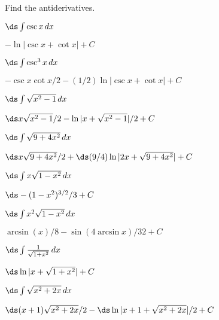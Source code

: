 \begin{exercises}

Find the antiderivatives.

\twocol

\begin{exercise} $\ds\int\csc x\,dx$
\begin{answer} $-\ln|\csc x+\cot x|+C$
\end{answer}\end{exercise}

\begin{exercise} $\ds\int\csc^3 x\,dx$
\begin{answer} $-\csc x\cot x/2-(1/2)\ln|\csc x+\cot x|+C$
\end{answer}\end{exercise}

\begin{exercise} $\ds\int\sqrt{x^2-1}\,dx$
\begin{answer} $\ds x\sqrt{x^2-1}/2-\ln|x+\sqrt{x^2-1}|/2+C$
\end{answer}\end{exercise}

\begin{exercise} $\ds\int\sqrt{9+4x^2}\,dx$
\begin{answer} $\ds x\sqrt{9+4x^2}/2+\hbox{$\ds(9/4)\ln|2x+\sqrt{9+4x^2}|+C$}$
\end{answer}\end{exercise}

\begin{exercise} $\ds\int x\sqrt{1-x^2}\,dx$
\begin{answer} $\ds -(1-x^2)^{3/2}/3+C$
\end{answer}\end{exercise}

\begin{exercise} $\ds\int x^2\sqrt{1-x^2}\,dx$
\begin{answer} $\arcsin(x)/8-\sin(4\arcsin x)/32+C$
\end{answer}\end{exercise}

\begin{exercise} $\ds\int{1\over\sqrt{1+x^2}}\,dx$
\begin{answer} $\ds \ln|x+\sqrt{1+x^2}|+C$
\end{answer}\end{exercise}

\begin{exercise} $\ds\int\sqrt{x^2+2x}\,dx$
\begin{answer} $\ds (x+1)\sqrt{x^2+2x}/2-\hbox{$\ds\ln|x+1+\sqrt{x^2+2x}|/2+C$}$
\end{answer}\end{exercise}


\end{exercises}
